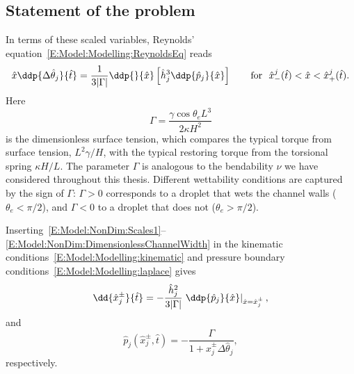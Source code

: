 \subsection{Statement of the problem}
In terms of these scaled variables, Reynolds' equation~\eqref{E:Model:Modelling:ReynoldsEq} reads
\begin{equation}\label{E:Model:NonDim:ReynoldsEq}
 \hat{x} \ddp{ \Delta \hat{\theta}_{j}}{\hat{t}}= \frac{1}{3|\Gamma|}\ddp{}{\hat{x}}\left[\hat{h}_j^3\ddp{\hat{p}_j}{\hat{x}}\right] \qquad \text{for} ~~\hat{x}_{-}^j(\hat{t})< \hat{x} <\hat{x}_{+}^j(\hat{t}).
\end{equation}
Here
\begin{equation}\label{E:Model:NonDim:GammaDefinition}
\Gamma = \frac{\gamma \cos \theta_e L^3}{2 \kappa H^2}
\end{equation}
is the dimensionless surface tension, which compares the typical torque from surface tension, $L^2\gamma/H$, with the typical restoring torque from the torsional spring $\kappa H/L$. The parameter $\Gamma$ is analogous to the bendability $\nu$ we have considered throughout this thesis. Different wettability conditions are captured by the sign of $\Gamma$: $\Gamma > 0$ corresponds to a droplet that wets the channel walls ($\theta_e < \pi/2$), and $\Gamma < 0$ to a droplet that does not ($\theta_e > \pi/2$).

Inserting~\eqref{E:Model:NonDim:Scales1}--\eqref{E:Model:NonDim:DimensionlessChannelWidth} in the kinematic conditions~\eqref{E:Model:Modelling:kinematic} and pressure boundary conditions~\eqref{E:Model:Modelling:laplace} gives
\begin{equation}\label{E:Model:NonDim:Kinematic}
\dd{\hat{x}_j^{\pm}}{\hat{t}} = -\frac{\hat{h}_j^2}{3|\Gamma|}\left.\ddp{\hat{p}_j}{\hat{x}}\right|_{\hat{x} = \hat{x}_{j}^{\pm}},
\end{equation}
and
\begin{equation}\label{E:Model:NonDim:Laplace}
\hat{p}_j(\hat{x}_{j}^{\pm}, \hat{t}) = -\frac{\Gamma}{1 + \hat{x}_j^{\pm}\Delta \hat{\theta}_j},
\end{equation}
respectively.

